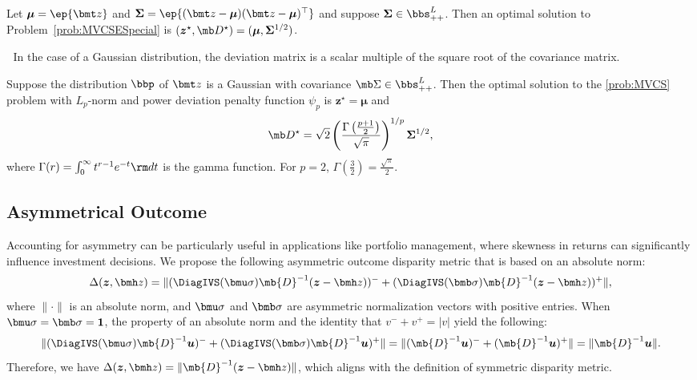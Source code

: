 \documentclass[mnsc, nonblindrev]{informswp}
\newcommand{\1}[1]{\mathds{1}{\left(#1\right)}}
\begin{document}
\begin{theorem}
\label{chap8:thm:QuadraticMVCSE}
Let $\bm \mu = \ep{\bmt z}$ and $\bm \Sigma = \ep{(\bmt z - \bm \mu)(\bmt z - \bm \mu)^\top}$ and suppose $\bm \Sigma \in \bbs^L_{++}$. Then an optimal solution to Problem~\eqref{prob:MVCSESpecial} is $(\bm z^\star, \mb D^\star) = (\bm \mu, \bm \Sigma^{1/2})$.
\end{theorem}

\medskip
{} $\;$
In the case of a Gaussian distribution, the deviation matrix is a scalar multiple of the square root of the covariance matrix.

\begin{theorem}
\label{chap8:thm:GaussianMVCSE}
Suppose the distribution $\bbp$ of $\bmt z$ is a Gaussian with covariance $\mb \Sigma \in \bbs^L_{++}$. Then the optimal solution to the \ref{prob:MVCS} problem with $L_p$-norm and power deviation penalty function $\psi_p$ is $\bm z^\star = \bm \mu$ and
$$
\mb D^\star = \sqrt{2}\left(\frac{\Gamma \left( \frac{p+1}{2}\right) }{\sqrt{\pi}} \right)^{1/p} \bm \Sigma^{1/2},
$$
where $\Gamma(r) = \int_0^{\infty} t^{r-1} e^{-t} {\rm d}t$ is the gamma function. For $p = 2$, $\Gamma \left( \frac{3}{2} \right) = \frac{\sqrt{\pi}}{2}$.\footnotemark{}
\end{theorem}

\subsection{Asymmetrical Outcome}

Accounting for asymmetry can be particularly useful in applications like portfolio management, where skewness in returns can significantly influence investment decisions.  We propose the following asymmetric outcome disparity metric that is based on an absolute norm:
\[
\Delta(\bm z,\bmh z) = \|(\DiagIVS(\bmu \sigma) \mb{D}^{-1} (\bm z-\bmh z))^- + (\DiagIVS(\bmb \sigma) \mb{D}^{-1} (\bm z-\bmh z))^+ \|,
\]
where $\|\cdot\|$ is an absolute norm, and \( \bmu \sigma \) and \( \bmb \sigma \) are asymmetric normalization vectors with positive entries. 
When $\bmu \sigma = \bmb \sigma= \bm 1$, the property of an absolute norm and the identity that $v^- + v^+ = |v|$ yield the following:
$$
\|(\DiagIVS(\bmu \sigma) \mb{D}^{-1} \bm u)^- + (\DiagIVS(\bmb \sigma) \mb{D}^{-1} \bm u)^+\| = \| (\mb{D}^{-1} \bm u)^- + (\mb{D}^{-1} \bm u)^+\| = \| \mb{D}^{-1} \bm u\|. 
$$
Therefore, we have $\Delta(\bm z,\bmh z) = \|\mb{D}^{-1}(\bm z-\bmh z)\|$, which aligns with the definition of symmetric disparity metric.
\end{document}
